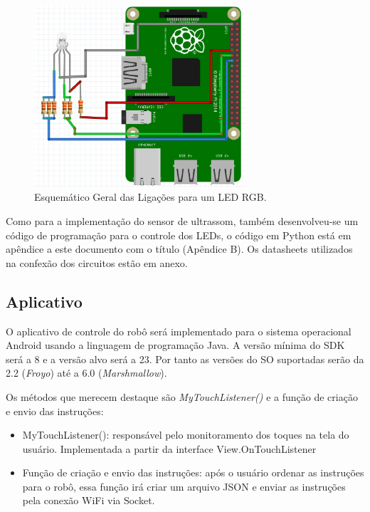 \begin{figure}[H]
    \centering
    \includegraphics[width=0.7\textwidth]{figuras/esquematico_led.eps}
    \caption{Esquemático Geral das Ligações para um LED RGB.}
    \label{fig:esquematico_led}
\end{figure}

Como para a implementação do sensor de ultrassom, também desenvolveu-se um código de programação para o controle dos LEDs, o código
em Python está em apêndice a este documento com o título (Apêndice B). Os datasheets utilizados na confexão dos circuitos estão em anexo.


\subsection{Aplicativo}

O aplicativo de controle do robô será implementado para o sistema operacional Android usando a linguagem de programação Java. A versão mínima do
SDK será a 8 e a versão alvo será a 23. Por tanto as versões do SO suportadas serão da 2.2 (\textit{Froyo}) até a 6.0 (\textit{Marshmallow}).

Os métodos que merecem destaque são \textit{MyTouchListener()} e a função de criação e envio das instruções:
\begin{itemize}
\item MyTouchListener(): responsável pelo monitoramento dos toques na tela do usuário. Implementada a partir da interface View.OnTouchListener
\item Função de criação e envio das instruções: após o usuário ordenar as instruções para o robô, essa função irá criar um arquivo JSON e enviar as instruções pela conexão WiFi via Socket.
\end{itemize}

